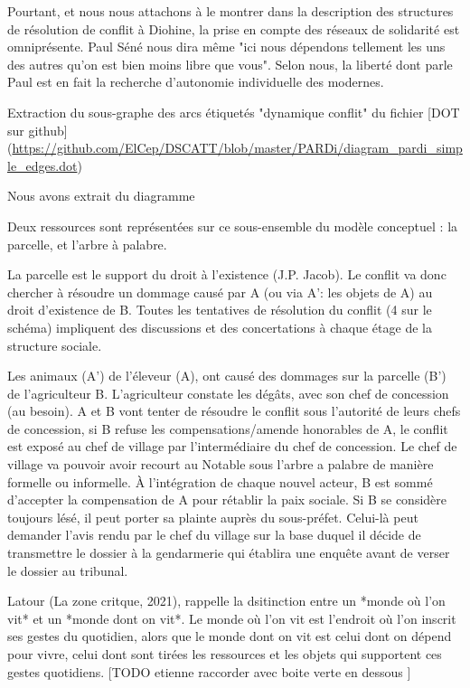 Pourtant, et nous nous  attachons à le montrer dans la description des structures de résolution de conflit à Diohine, la prise en compte des réseaux de solidarité est omniprésente. Paul Séné nous dira même "ici nous dépendons tellement les uns des autres qu'on est bien moins libre que vous". Selon nous, la liberté dont parle Paul est en fait la recherche d'autonomie individuelle des modernes.

Extraction du sous-graphe des arcs étiquetés  "dynamique conflit" du fichier [DOT sur github](\url{https://github.com/ElCep/DSCATT/blob/master/PARDi/diagram_pardi_simple_edges.dot})

Nous avons extrait du diagramme 


Deux ressources sont représentées sur ce sous-ensemble du modèle conceptuel : la parcelle, et l'arbre à palabre. 

La parcelle est le support du droit à l'existence (J.P. Jacob). Le conflit va donc chercher à résoudre un dommage causé par A (ou via A': les objets de A) au droit d'existence de B. Toutes les tentatives de résolution du conflit (4 sur le schéma) impliquent des discussions et des concertations à chaque étage de la structure sociale.

Les animaux (A') de l'éleveur (A), ont causé des dommages sur la parcelle (B') de l'agriculteur B. L'agriculteur constate les dégâts, avec son chef de concession (au besoin). A et B vont tenter de résoudre le conflit sous l'autorité de leurs chefs de concession, si B refuse les compensations/amende honorables de A, le conflit est exposé au chef de village par l'intermédiaire du chef de concession. Le chef de village va pouvoir avoir recourt au Notable sous l'arbre a palabre de manière formelle ou informelle. À l'intégration de chaque nouvel acteur, B est sommé d'accepter la compensation de A pour rétablir la paix sociale. Si B se considère toujours lésé, il peut porter sa plainte auprès du sous-préfet. Celui-là peut demander l'avis rendu par le chef du village sur la base duquel il décide de transmettre le dossier à la gendarmerie qui établira une enquête avant de verser le dossier au tribunal. 

Latour (La zone critque, 2021), rappelle la dsitinction entre  un *monde où l'on vit* et un *monde dont on vit*. Le monde où l'on vit  est l'endroit où l'on inscrit ses gestes du quotidien, alors que le monde dont on vit est  celui dont on dépend pour vivre, celui dont sont tirées les ressources et les objets qui supportent ces gestes quotidiens. [TODO etienne raccorder avec boite verte en dessous ]

